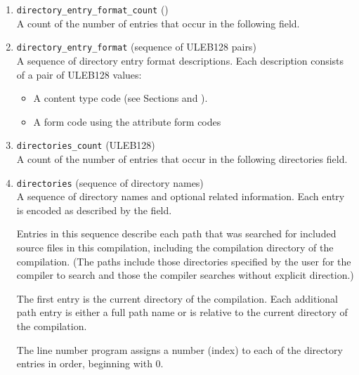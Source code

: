 \begin{enumerate}[1. ]
\setcounter{enumi}{\value{saveenumi}}
\item \texttt{directory\_entry\_format\_count} (\HFTubyte) \\
    A count of the number of entries that occur in the
    following  field.

\item \texttt{directory\_entry\_format} (sequence of ULEB128 pairs) \\
    A sequence of directory entry format descriptions.
    Each description consists of a pair of ULEB128 values:
\begin{itemize}
\setlength{\itemsep}{0em}
\item A content type code (see 
Sections  and
).

\item A form code using the attribute form codes
\end{itemize}

\item \texttt{directories\_count} (ULEB128) \\
A count of the number of entries that occur in the
following directories field.

\item \texttt{directories} (sequence of directory names) \\
A sequence of directory names and optional related
information. Each entry is encoded as described
by the  field.
   
Entries in this sequence describe each path that was
searched for included source files in this compilation,
including the compilation directory of the compilation.
(The paths include those directories specified by the
user for the compiler to search and those the compiler
searches without explicit direction.)
   
The first entry is the current directory of the compilation.
Each additional path entry is either a full path name or
is relative to the current directory of the compilation.
   
The line number program assigns a number (index) to each
of the directory entries in order, beginning with 0.
   

\end{enumerate}
